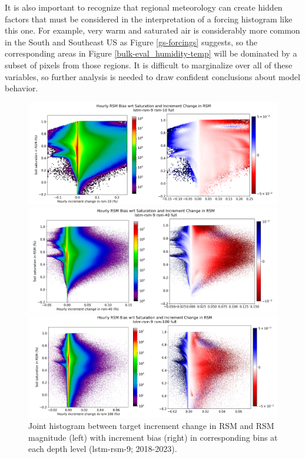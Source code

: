It is also important to recognize that regional meteorology can create hidden factors that must be considered in the interpretation of a forcing histogram like this one. For example, very warm and saturated air is considerably more common in the South and Southeast US as Figure \ref{gs-forcings} suggests, so the corresponding areas in Figure \ref{bulk-eval_humidity-temp} will be dominated by a subset of pixels from those regions. It is difficult to marginalize over all of these variables, so further analysis is needed to draw confident conclusions about model behavior.

\begin{figure}[hp!]
    \centering

    \includegraphics[width=.99\linewidth,draft=false]{figures/seq-eval_lstm-rsm-9/eval-grid_full_lstm-rsm-9_rsm-10_hist-state-increment_bias.png}

    \includegraphics[width=.99\linewidth,draft=false]{figures/seq-eval_lstm-rsm-9/eval-grid_full_lstm-rsm-9_rsm-40_hist-state-increment_bias.png}

    \includegraphics[width=.99\linewidth,draft=false]{figures/seq-eval_lstm-rsm-9/eval-grid_full_lstm-rsm-9_rsm-100_hist-state-increment_bias.png}

    \caption{Joint histogram between target increment change in RSM and RSM magnitude (left) with increment bias (right) in corresponding bins at each depth level (lstm-rsm-9; 2018-2023).}
    \label{bulk-eval_state-increment}
\end{figure}

